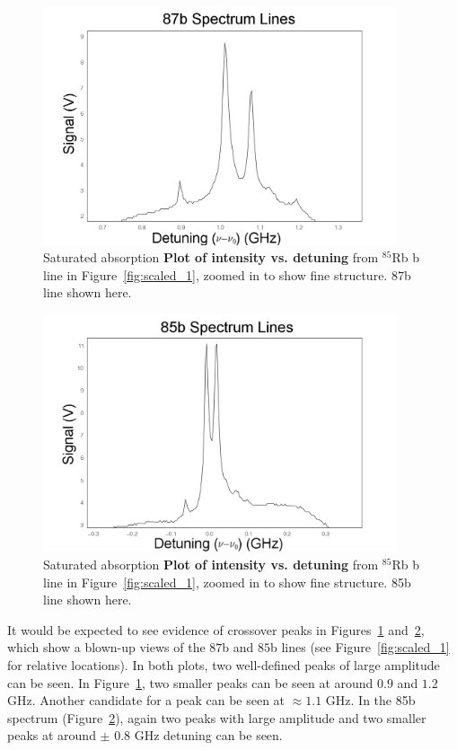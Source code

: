 \documentclass[paper=a4, fontsize=11pt]{scrartcl} %
\numberwithin{equation}{section}
\numberwithin{figure}{section}
\numberwithin{table}{section}
\begin{document}

\begin{figure}[h] \begin{center}
  \includegraphics[height=70mm]{detune1.png}
  \caption{Saturated absorption \textbf{Plot of intensity
      vs. detuning} from $^{85}$Rb b line in
    Figure~\ref{fig:scaled_1}, zoomed in to show fine structure. 87b
    line shown here.}
  \label{fig:det1}
\end{center} \end{figure}

\begin{figure}[h] \begin{center}
  \includegraphics[height=70mm]{detune2.png}
  \caption{Saturated absorption \textbf{Plot of intensity vs. detuning} from $^{85}$Rb b line in
    Figure~\ref{fig:scaled_1}, zoomed in to show fine structure. 85b
    line shown here.}
  \label{fig:det2}
\end{center} \end{figure}

It would be expected to see evidence of crossover peaks in
Figures~\ref{fig:det1} and~\ref{fig:det2}, which show a blown-up
views of the $87$b and $85$b lines (see Figure~\ref{fig:scaled_1} for relative locations). In both plots, two well-defined peaks of large amplitude can be seen. In Figure~\ref{fig:det1}, two smaller peaks can be seen at around $0.9$ and $1.2$ GHz. Another candidate for a peak can be seen at $\approx 1.1$ GHz. In the 85b spectrum (Figure~\ref{fig:det2}), again two peaks
with large amplitude and two smaller peaks at around $\pm$ 0.8 GHz
detuning can be seen.
\end{document}
